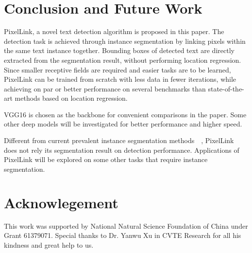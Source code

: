 \documentclass[letterpaper]{article} \usepackage{aaai18}  \usepackage{times}  \usepackage{helvet}  \usepackage{courier}  \usepackage{url}  \usepackage{graphicx}
\begin{document}
	\section{Conclusion and Future Work}
	PixelLink, a novel text detection algorithm is proposed in this paper. The detection task is achieved through instance segmentation by linking pixels within the same text instance together. Bounding boxes of detected text are directly extracted from the segmentation result, without performing location regression. Since smaller receptive fields are required and easier tasks are to be learned, PixelLink can be trained from scratch with less data in fewer iterations, while achieving on par or better performance on several benchmarks than state-of-the-art methods based on location regression.
	
	VGG16 is chosen as the backbone for convenient comparisons in the paper. Some other deep models will be investigated for better performance and higher speed.
	
	Different from current prevalent instance segmentation methods~\cite{Li2016FCIS}~\cite{He2017MaskRCNN}, PixelLink does not rely its segmentation result on detection performance. Applications of PixelLink will be explored on some other tasks that require instance segmentation.
	\section*{Acknowlegement}
	This work was supported by National  Natural  Science  Foundation  of  China  under
	Grant 61379071. Special thanks to Dr. Yanwu Xu in CVTE Research for all his kindness and great help to us.
	
	
	
\end{document}
